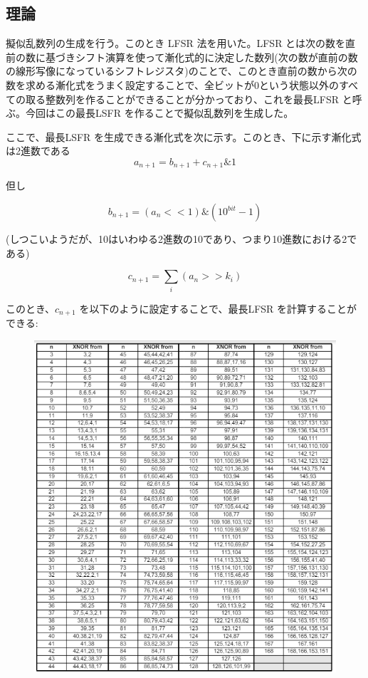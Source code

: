 \documentclass[xelatex,ja=standard]{bxjsarticle}
\begin{document}
\subsection{理論}

擬似乱数列の生成を行う。このとき LFSR 法を用いた。LFSR とは次の数を直前の数に基づきシフト演算を使って漸化式的に決定した数列(次の数が直前の数の線形写像になっているシフトレジスタ)のことで、このとき直前の数から次の数を求める漸化式をうまく設定することで、全ビットが0という状態以外のすべての取る整数列を作ることができることが分かっており、これを最長LFSR と呼ぶ。今回はこの最長LSFR を作ることで擬似乱数列を生成した。

ここで、最長LSFR を生成できる漸化式を次に示す。このとき、下に示す漸化式は2進数である
\[
a_{n+1}  = b_{n+1} + c_{n+1} \& 1
\]

但し

\[
b_{n+1} = ( a_{n} << 1 ) \& (10^{bit} - 1)
\]

(しつこいようだが、10はいわゆる2進数の10であり、つまり10進数における2である)

\[
c_{n+1} = \sum_{i} (a_n >> k_i)
\]

このとき、$ c_{n+1} $ を以下のように設定することで、最長LFSR を計算することができる:

\begin{figure}[htbp]
    \centering
    \includegraphics[scale=1]
{1.png}
    \label{fig:1}
\end{figure}
\end{document}
